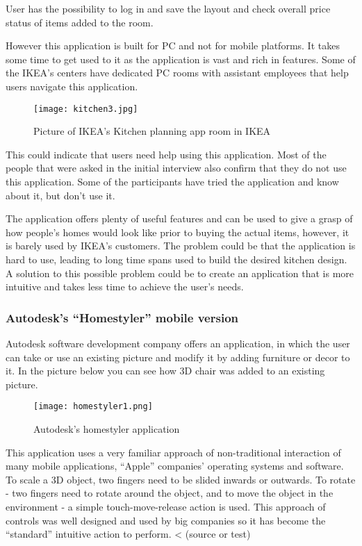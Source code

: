User has the possibility to log in and save the layout and check overall price status of items added to the room.

However this application is built for PC and not for mobile platforms. It takes some time to get used to it as the application is vast and rich in features. Some of the IKEA’s centers have dedicated PC rooms with assistant employees that help users navigate this application. 

\begin{figure}[H]
\centering
\texttt{[image: kitchen3.jpg]}
\caption{Picture of IKEA’s Kitchen planning app room in IKEA}
\end{figure}


This could indicate that users need help using this application. Most of the people that were asked in the initial interview also confirm that they do not use this application. Some of the participants have tried the application and know about it, but don’t use it.

The application offers plenty of useful features and can be used to give a grasp of how people’s homes would look like prior to buying the actual items, however, it is barely used by IKEA’s customers. The problem could be that the application is hard to use, leading to long time spans used to build the desired kitchen design. A solution to this possible problem could be to create an application that is more intuitive and takes less time to achieve the user’s needs.

\subsubsection{Autodesk’s “Homestyler” mobile version}

Autodesk software development company offers an application, in which the user can take or use an existing picture and modify it by adding furniture or decor to it. In the picture below you can see how 3D chair was added to an existing picture.  

\begin{figure}[H]
\centering
\texttt{[image: homestyler1.png]}
\caption{Autodesk's homestyler application}
\end{figure}

This application uses a very familiar approach of non-traditional interaction of many mobile applications, “Apple” companies’ operating systems and software. To scale a 3D object, two fingers need to be slided inwards or outwards. To rotate - two fingers need to rotate around the object, and to move the object in the environment - a simple touch-move-release action is used. This approach of controls was well designed and used by big companies so it has become the “standard” intuitive action to perform. < (source or test)


